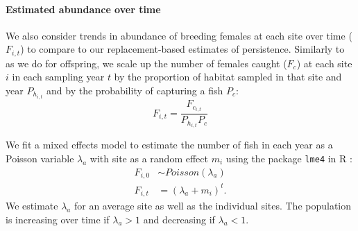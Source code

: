 \documentclass[12pt, oneside]{article}   	%
\begin{document}

\paragraph*{Estimated abundance over time}

We also consider trends in abundance of breeding females at each site over time ($F_{i,t}$) to compare to our replacement-based estimates of persistence. Similarly to as we do for offspring, we scale up the number of females caught ($F_c$) at each site $i$ in each sampling year $t$ by the proportion of habitat sampled in that site and year $P_{h_{i,t}}$ and by the probability of capturing a fish $P_c$:
\begin{equation}
F_{i,t} = \frac{F_{c_{i,t}}}{P_{h_{i,t}}P_c}
\end{equation}

We fit a mixed effects model to estimate the number of fish in each year as a Poisson variable $\lambda_a$ with site as a random effect $m_i$ using the package \texttt{lme4} in R \citep{lme42015package}:
\begin{equation} \label{EQN_Abundance}
\begin{split}
F_{i,0} & \sim Poisson(\lambda_a) \\
F_{i,t} & = (\lambda_a + m_i)^t.
\end{split}
\end{equation}
We estimate $\lambda_a$ for an average site as well as the individual sites. The population is increasing over time if $\lambda_a > 1$ and decreasing if $\lambda_a < 1$.

\begin{equation}
\end{equation}
\end{document}
